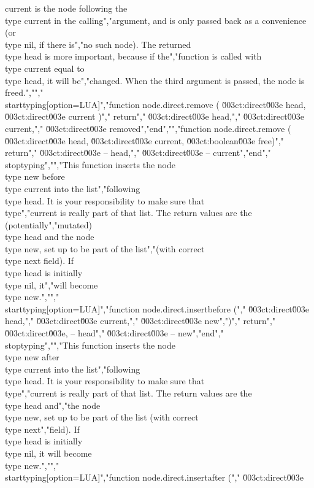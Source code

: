 {current} is the node following the \\type {current} in the calling","argument, and is only passed back as a convenience (or \\type {nil}, if there is","no such node). The returned \\type {head} is more important, because if the","function is called with \\type {current} equal to \\type {head}, it will be","changed. When the third argument is passed, the node is freed.","","\\starttyping[option=LUA]","function node.direct.remove ( \u003ct:direct\u003e head, \u003ct:direct\u003e current )","    return","        \u003ct:direct\u003e head,","        \u003ct:direct\u003e current,","        \u003ct:direct\u003e removed","end","","function node.direct.remove ( \u003ct:direct\u003e head, \u003ct:direct\u003e current, \u003ct:boolean\u003e free)","    return","        \u003ct:direct\u003e -- head,","        \u003ct:direct\u003e -- current","end","\\stoptyping","","This function inserts the node \\type {new} before \\type {current} into the list","following \\type {head}. It is your responsibility to make sure that \\type","{current} is really part of that list. The return values are the (potentially","mutated) \\type {head} and the node \\type {new}, set up to be part of the list","(with correct \\type {next} field). If \\type {head} is initially \\type {nil}, it","will become \\type {new}.","","\\starttyping[option=LUA]","function node.direct.insertbefore (","    \u003ct:direct\u003e head,","    \u003ct:direct\u003e current,","    \u003ct:direct\u003e new",")","    return","        \u003ct:direct\u003e, -- head","        \u003ct:direct\u003e  -- new","end","\\stoptyping","","This function inserts the node \\type {new} after \\type {current} into the list","following \\type {head}. It is your responsibility to make sure that \\type","{current} is really part of that list. The return values are the \\type {head} and","the node \\type {new}, set up to be part of the list (with correct \\type {next}","field). If \\type {head} is initially \\type {nil}, it will become \\type {new}.","","\\starttyping[option=LUA]","function node.direct.insertafter (","    \u003ct:direct\u003e 